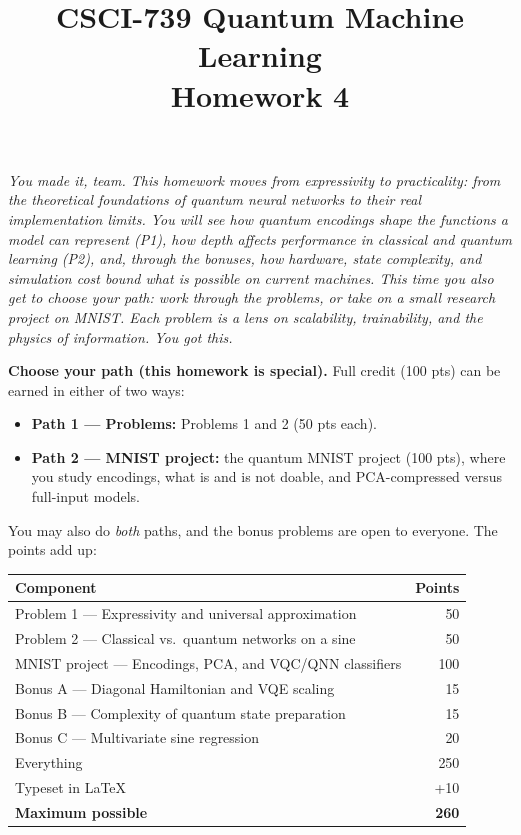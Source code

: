 \documentclass[11pt]{article}
\title{CSCI-739 Quantum Machine Learning \\[4pt] \large Homework 4}
\date{}
\begin{document}
\maketitle

\begin{center}
\textit{You made it, team. This homework moves from expressivity to practicality: from the theoretical foundations of quantum neural networks to their real implementation limits. You will see how quantum encodings shape the functions a model can represent (P1), how depth affects performance in classical and quantum learning (P2), and, through the bonuses, how hardware, state complexity, and simulation cost bound what is possible on current machines. This time you also get to choose your path: work through the problems, or take on a small research project on MNIST. Each problem is a lens on scalability, trainability, and the physics of information. You got this. \smiley{}}
\end{center}

\vspace{1em}
\noindent
\textbf{Choose your path (this homework is special).}
Full credit (100 pts) can be earned in either of two ways:
\begin{itemize}
  \item \textbf{Path 1 — Problems:} Problems 1 and 2 (50 pts each).
  \item \textbf{Path 2 — MNIST project:} the quantum MNIST project (100 pts), where you study encodings, what is and is not doable, and PCA-compressed versus full-input models.
\end{itemize}
You may also do \emph{both} paths, and the bonus problems are open to everyone. The points add up:

\begin{center}
\begin{tabular}{lr}
\toprule
Component & Points \\
\midrule
Problem 1 — Expressivity and universal approximation & 50 \\
Problem 2 — Classical vs.\ quantum networks on a sine & 50 \\
MNIST project — Encodings, PCA, and VQC/QNN classifiers & 100 \\
Bonus A — Diagonal Hamiltonian and VQE scaling & 15 \\
Bonus B — Complexity of quantum state preparation & 15 \\
Bonus C — Multivariate sine regression & 20 \\
\midrule
Everything & 250 \\
Typeset in \LaTeX{} & +10 \\
\midrule
\textbf{Maximum possible} & \textbf{260} \\
\bottomrule
\end{tabular}
\end{center}
\end{document}
